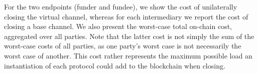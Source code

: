   For the two endpoints (funder and fundee), we show the cost of unilaterally
  closing the virtual channel, whereas for each intermediary we
  report the cost of closing a base channel. We also present the worst-case
  total on-chain cost,
  aggregated over all parties. Note that the latter cost is not simply the sum
  of the worst-case costs of all parties, as one party's worst case is not
  necessarily the worst case of another. This cost rather represents the maximum
  possible load an instantiation of each protocol could add to the blockchain
  when closing.

  \addtolength{\intextsep}{-21pt}
  \begin{table}[h!]
\end{table}
